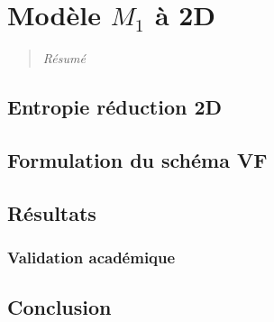 \chapter{Modèle $M_1$ à 2D}
\label{chap:ch3}
\begin{quotation}
\textit{Résumé}
\end{quotation}
\minitoc
\newpage
 
  
\section{Entropie réduction 2D}
\section{Formulation du schéma VF}
\section{Résultats}
\subsection{Validation académique}
\section{Conclusion}

